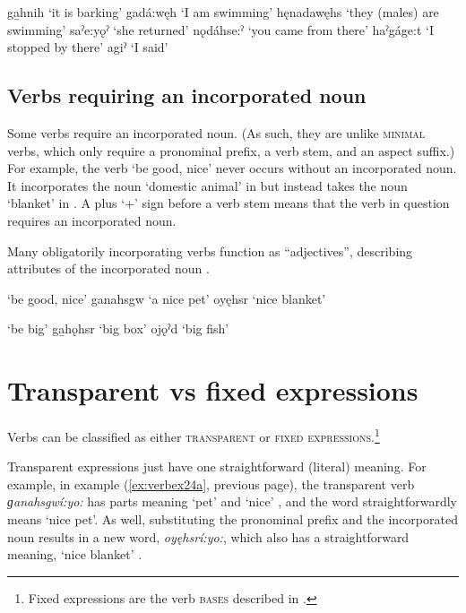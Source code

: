 \ea\label{ex:verbex23}
\ea\label{ex:verbex23a} ga̱hnih ‘it is barking’
\ex\label{ex:verbex23b} gadá:węh ‘I am swimming’
\ex\label{ex:verbex23c} hęnadawęhs ‘they (males) are swimming’
\ex\label{ex:verbex23d} saˀe:yǫˀ ‘she returned’
\ex\label{ex:verbex23e} nǫdáhse:ˀ ‘you came from there’
\ex\label{ex:verbex23f} haˀgáge:t ‘I stopped by there’
\ex\label{ex:verbex23g} agiˀ ‘I said’
\z
\z


\subsection{Verbs requiring an incorporated noun} \label{Verbs requiring an incorporated noun}
Some verbs require an incorporated noun. (As such, they are unlike \textsc{minimal} verbs, which only require a pronominal prefix, a verb stem, and an aspect suffix.) For example, the verb  ‘be good, nice’ never occurs without an incorporated noun. It incorporates the noun  ‘domestic animal’ in  but instead takes the noun  ‘blanket’ in . A plus ‘+’ sign before a verb stem means that the verb in question requires an incorporated noun.

Many obligatorily incorporating verbs function as “adjectives”, describing attributes of the incorporated noun . 

\ea\label{ex:verbex24}  ‘be good, nice’
\ea ganahsgw ‘a nice pet’\label{ex:verbex24a}
\ex oyęhsr ‘nice blanket’\label{ex:verbex24b}
\z
\z


\ea\label{ex:verbex25}  ‘be big’
\ea ga̱hǫhsr ‘big box’\label{ex:verbex25a}
\ex ojǫˀd ‘big fish’\label{ex:verbex25b}
\z
\z

\largerpage
\section{Transparent vs fixed expressions} \label{Fixed and transparent expressions}
Verbs can be classified as either \textsc{transparent} or \textsc{fixed expressions}.\footnote{Fixed expressions are the verb \textsc{bases} described in \citet{foster_base_1989}.} 

Transparent expressions just have one straightforward (literal) meaning. For example, in example (\ref{ex:verbex24a}, previous page), the transparent verb \textit{ɡanahsgwí:yo:} has parts meaning ‘pet’  and ‘nice’ , and the word straightforwardly means ‘nice pet’. As well, substituting the pronominal prefix and the incorporated noun results in a new word, \textit{oyęhsrí:yo:}, which also has a straightforward meaning, ‘nice blanket’ .

